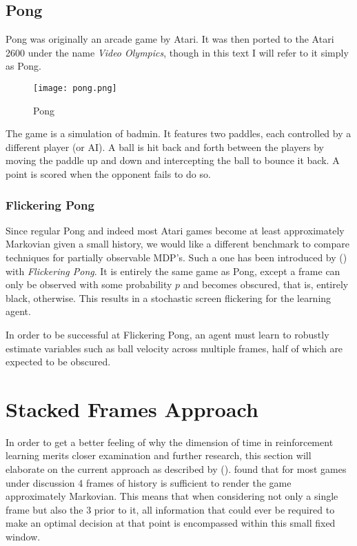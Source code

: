\subsection{Pong}
\label{sub:pong}
Pong was originally an arcade game by Atari.
It was then ported to the Atari 2600
under the name \textit{Video Olympics},
though in this text I will refer to it simply as Pong.

\begin{figure}[htpb]
  \centering
  \texttt{[image: pong.png]}
  \caption{Pong}
  \label{fig:pong}
\end{figure}

The game is a simulation of badmin.
It features two paddles,
each controlled by a different player (or AI).
A ball is hit back and forth between the players
by moving the paddle up and down
and intercepting the ball to bounce it back.
A point is scored when the opponent
fails to do so.

\subsubsection{Flickering Pong}
Since regular Pong and indeed most Atari games
become at least approximately Markovian
given a small history,
we would like a different benchmark
to compare techniques
for partially observable MDP's.
Such a one has been introduced by \citeauthor{Hausknecht2015} (\citeyear{Hausknecht2015})
with \textit{Flickering Pong}.
It is entirely the same game as Pong,
except a frame can only be observed with some probability $p$
and becomes obscured, that is, entirely black, otherwise.
This results in a stochastic screen flickering for the learning agent.

In order to be successful at Flickering Pong,
an agent must learn to robustly
estimate variables such as ball velocity
across multiple frames,
half of which are expected to be obscured.

\paragraph{}

\section{Stacked Frames Approach}
\label{sec:stacked_frames_approach}
In order to get a better feeling
of why the dimension of time in reinforcement learning
merits closer examination and further research,
this section will elaborate on the current approach
as described by
\citeauthor{Mnih2013} (\citeyear{Mnih2013}).
\citeauthor{Mnih2013}
found that for most games under discussion
4 frames of history is sufficient to render the game approximately Markovian.
This means that when considering not only a single frame
but also the 3 prior to it,
all information that could ever be required to make an optimal decision
at that point is encompassed within this small fixed window.

